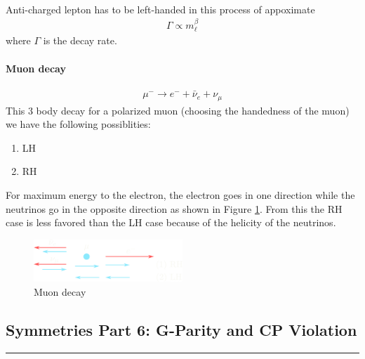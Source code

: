 \documentclass[../main.tex]{subfiles}
\begin{document}
\paragraph*{} Anti-charged lepton has to be left-handed in this process of appoximate
\begin{align*}
    \Gamma \propto m_\ell^\beta
\end{align*}
where $\Gamma$ is the decay rate.

\paragraph*{Muon decay}
\begin{align*}
    \mu^- \to e^- + \bar \nu_e + \nu_\mu
\end{align*}
This 3 body decay for a polarized muon (choosing the handedness of the muon) we have the following
possiblities:
\begin{enumerate}
    \item LH
    \item RH
\end{enumerate}
For maximum energy to the electron, the electron goes in one direction while the neutrinos go in the
opposite direction as shown in Figure \ref{fig:muon_decay}. From this the RH case is less favored
than the LH case because of the helicity of the neutrinos.
\begin{figure}[ht]
    \centering
    \includegraphics[width=0.5\textwidth]{muon_decay.png}
    \caption{Muon decay}
    \label{fig:muon_decay}
\end{figure}

\newpage
{}
\subsection*{Symmetries Part 6: G-Parity and CP Violation}
\hrule \vspace{10px}
\end{document}
